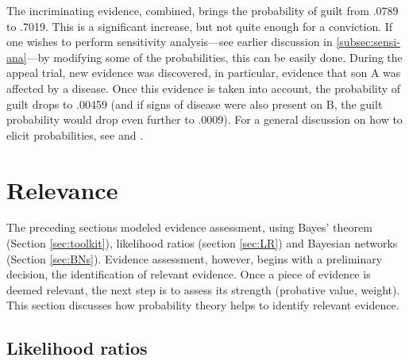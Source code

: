 \documentclass{article}
\begin{document}
\noindent 
The incriminating evidence, combined, brings the probability of guilt from .0789 to .7019. This is a significant increase, but not quite enough for a conviction. If one wishes to perform sensitivity analysis---see earlier discussion in \ref{subsec:sensi-ana}---by modifying some of the probabilities, this can be easily done.
During the appeal trial, new evidence was discovered, in particular, evidence that son A was affected by a disease. 
Once this evidence is taken into account, the probability of guilt drops to .00459  (and if signs of disease were also present on B, the guilt probability would drop even further to .0009). For a general discussion on how to elicit probabilities, see \citep{renooij2001ProbabilityElicitationBeliefa} and
\citep{gaag2013elicit}.







































\section{Relevance}\label{sec:relevance}



The preceding sections modeled evidence assessment, using  Bayes' theorem (Section \ref{sec:toolkit}), likelihood ratios (section \ref{sec:LR}) and   Bayesian networks (Section \ref{sec:BNs}). 
Evidence assessment, however, begins with a preliminary decision, the identification of relevant evidence. 
Once a piece of evidence is deemed relevant, the next step is to assess its strength (probative value, weight). 
This section discusses how probability theory helps to identify relevant evidence.



\subsection{Likelihood ratios}
\end{document}
